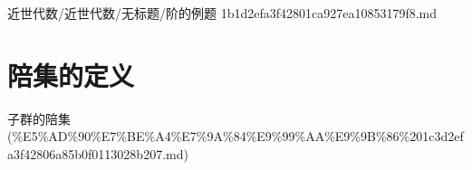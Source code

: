 \begin{note}[来源路径]

近世代数/近世代数/无标题/阶的例题 1b1d2efa3f42801ca927ea10853179f8.md

\end{note}

\section*{陪集的定义}

\begin{note}[来源上级主题]

子群的陪集 (\%E5\%AD\%90\%E7\%BE\%A4\%E7\%9A\%84\%E9\%99\%AA\%E9\%9B\%86\%201c3d2efa3f42806a85b0f0113028b207.md)

\end{note}


